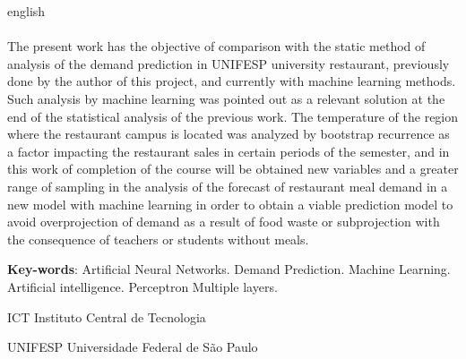 \documentclass[	12pt, Times, openright, twoside, a4paper, english, brazil]{abntex2}
\begin{document}
\begin{resumo}[Abstract]
 \begin{otherlanguage*}{english}

\paragraph*{} The present work has the objective of comparison with the static method of analysis of the demand prediction in UNIFESP university restaurant, previously done by the author of this project, and currently with machine learning methods. Such analysis by machine learning was pointed out as a relevant solution at the end of the statistical analysis of the previous work. The temperature of the region where the restaurant campus is located was analyzed by bootstrap recurrence as a factor impacting the restaurant sales in certain periods of the semester, and in this work of completion of the course will be obtained new variables and a greater range of sampling in the analysis of the forecast of restaurant meal demand in a new model with machine learning in order to obtain a viable prediction model to avoid overprojection of demand as a result of food waste or subprojection with the consequence of teachers or students without meals.

   \vspace{\onelineskip}
 
   \noindent 
   \textbf{Key-words}: Artificial Neural Networks. Demand Prediction. Machine Learning. Artificial intelligence. Perceptron Multiple layers.
 \end{otherlanguage*}
\end{resumo}

\listoffigures*
\cleardoublepage

\listoftables*
\cleardoublepage

\begin{siglas}
\item[ICT] Instituto Central de Tecnologia
\item[UNIFESP] Universidade Federal de São Paulo
\end{siglas}

\end{document}
